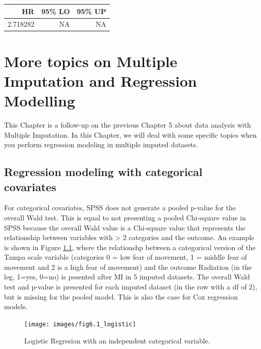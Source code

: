 \documentclass[
]{book}
\begin{document}
\begin{tabular}{r|r|r}
\hline
HR & 95\% LO & 95\% UP\\
\hline
2.718282 & NA & NA\\
\hline
\end{tabular}

\hypertarget{more-topics-on-multiple-imputation-and-regression-modelling}{%
\chapter{More topics on Multiple Imputation and Regression Modelling}\label{more-topics-on-multiple-imputation-and-regression-modelling}}

This Chapter is a follow-up on the previous Chapter 5 about data analysis with Multiple Imputation. In this Chapter, we will deal with some specific topics when you perform regression modeling in multiple imputed datasets.

\hypertarget{regression-modeling-with-categorical-covariates}{%
\section{Regression modeling with categorical covariates}\label{regression-modeling-with-categorical-covariates}}

For categorical covariates, SPSS does not generate a pooled p-value for the overall Wald test. This is equal to not presenting a pooled Chi-square value in SPSS because the overall Wald value is a Chi-square value that represents the relationship between variables with \textgreater{} 2 categories and the outcome. An example is shown in Figure \ref{fig:fig6-1}, where the relationshp between a categorical version of the Tampa scale variable (categories 0 = low fear of movement, 1 = middle fear of movement and 2 is a high fear of movement) and the outcome Radiation (in the leg, 1=yes, 0=no) is pesented after MI in 5 imputed datasets. The overall Wald test and p-value is presented for each imputed dataset (in the row with a df of 2), but is missing for the pooled model. This is also the case for Cox regression models.

\begin{figure}

{\centering \texttt{[image: images/fig6.1\_logistic]} 

}

\caption{Logistic Regresion with an independent categorical variable.}\label{fig:fig6-1}
\end{figure}
\end{document}
